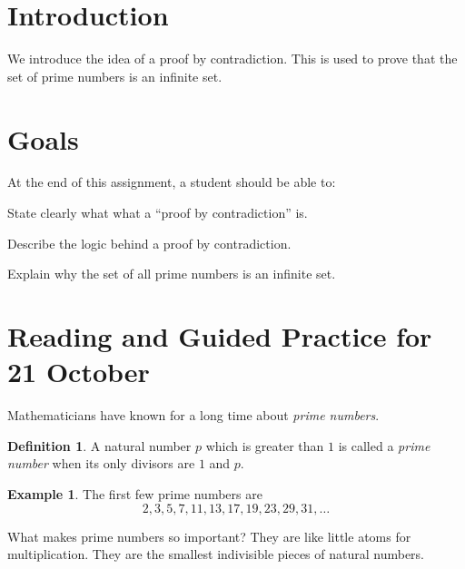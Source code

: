 \documentclass[12pt,letterpaper]{article}
\theoremstyle{definition}
\newtheorem{example}{Example}
\newtheorem*{definition}{Definition}
\begin{document}
\setlength{\parskip}{1ex plus 0.5ex minus 0.2ex}
\setlength{\parindent}{0pt}

\pagestyle{fancy}
\cfoot{}

\section*{Introduction}
We introduce the idea of a proof by contradiction.
This is used to prove that the set of prime numbers is an infinite set.

\section*{Goals}
At the end of this assignment, a student should be able to:
\begin{compactitem}
\item State clearly what what a ``proof by contradiction'' is.
\item Describe the logic behind a proof by contradiction.
\item Explain why the set of all prime numbers is an infinite set.
\end{compactitem}


\section*{Reading and Guided Practice for 21 October}

Mathematicians have known for a long time about \emph{prime numbers}.

\begin{definition} 
A natural number $p$ which is greater than $1$ is called a \emph{prime number} when its only divisors are $1$ and $p$.
\end{definition}

\begin{example}
The first few prime numbers are 
\[2, 3, 5, 7, 11, 13, 17, 19, 23, 29, 31, \ldots\]
\end{example}

What makes prime numbers so important?
They are like little atoms for multiplication.
They are the smallest indivisible pieces of natural numbers.
\end{document}
